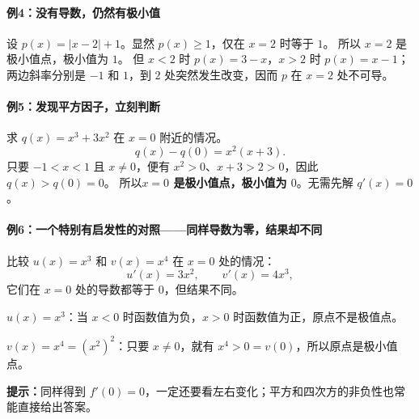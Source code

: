 \clearpage
\begin{examplebox}
\paragraph{例4：没有导数，仍然有极小值}
\begin{center}\end{center}

设 $p(x)=|x-2|+1$。显然 $p(x)\ge1$，仅在 $x=2$ 时等于 $1$。
所以 $x=2$ 是极小值点，极小值为 $1$。
但 $x<2$ 时 $p(x)=3-x$，$x>2$ 时 $p(x)=x-1$；两边斜率分别是 $-1$ 和 $1$，到 $2$ 处突然发生改变，因而 $p$ 在 $x=2$ 处不可导。

\end{examplebox}
\clearpage
\begin{examplebox}
\paragraph{例5：发现平方因子，立刻判断}
\begin{center}\end{center}

求 $q(x)=x^3+3x^2$ 在 $x=0$ 附近的情况。
\[
q(x)-q(0)=x^2(x+3).
\]
只要 $-1<x<1$ 且 $x\ne0$，便有 $x^2>0$、$x+3>2>0$，因此 $q(x)>q(0)=0$。
所以\textbf{$x=0$ 是极小值点，极小值为 $0$}。无需先解 $q'(x)=0$。

\end{examplebox}
\clearpage
\begin{examplebox}
\paragraph{例6：一个特别有启发性的对照——同样导数为零，结果却不同}
\begin{center}\end{center}

比较 $u(x)=x^3$ 和 $v(x)=x^4$ 在 $x=0$ 处的情况：
\[
u'(x)=3x^2,\qquad v'(x)=4x^3,
\]
它们在 $x=0$ 处的导数都等于 $0$，但结果不同。

$u(x)=x^3$：当 $x<0$ 时函数值为负，$x>0$ 时函数值为正，原点不是极值点。

$v(x)=x^4=(x^2)^2$：只要 $x\ne0$，就有 $x^4>0=v(0)$，所以原点是极小值点。

\textbf{提示：}同样得到 $f'(0)=0$，一定还要看左右变化；平方和四次方的非负性也常能直接给出答案。
\end{examplebox}
